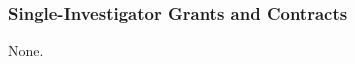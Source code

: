 \documentclass[10pt]{article}
\begin{document}
\subsubsection*{Single-Investigator Grants and Contracts}

None.


%
%
%


% 

\end{document}
